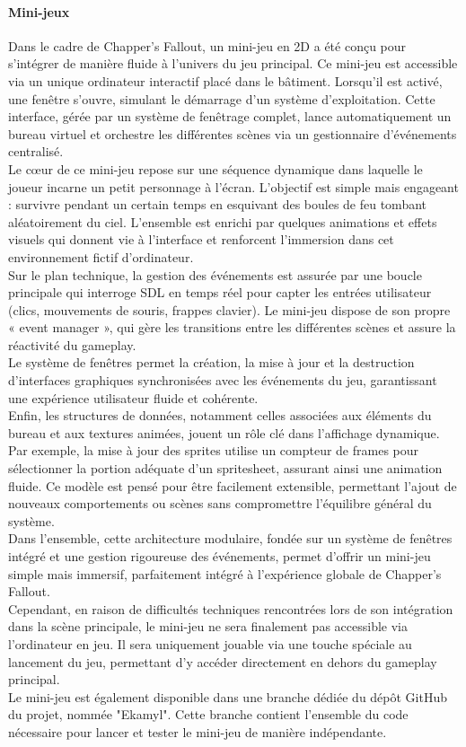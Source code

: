 \paragraph{Mini-jeux}
Dans le cadre de Chapper's Fallout, un mini-jeu en 2D a été conçu pour s’intégrer de manière fluide à l’univers 
du jeu principal. Ce mini-jeu est accessible via un unique ordinateur interactif placé dans le bâtiment. Lorsqu’il 
est activé, une fenêtre s’ouvre, simulant le démarrage d’un système d’exploitation. Cette interface, gérée par un 
système de fenêtrage complet, lance automatiquement un bureau virtuel et orchestre les différentes scènes via un 
gestionnaire d’événements centralisé.
\\
Le cœur de ce mini-jeu repose sur une séquence dynamique dans laquelle le joueur incarne un petit personnage à l’écran. 
L’objectif est simple mais engageant : survivre pendant un certain temps en esquivant des boules de feu tombant aléatoirement 
du ciel. L’ensemble est enrichi par quelques animations et effets visuels qui donnent vie à l’interface et renforcent 
l’immersion dans cet environnement fictif d’ordinateur.
\\
Sur le plan technique, la gestion des événements est assurée par une boucle principale qui interroge SDL en temps réel pour 
capter les entrées utilisateur (clics, mouvements de souris, frappes clavier). Le mini-jeu dispose de son propre « event manager », 
qui gère les transitions entre les différentes scènes et assure la réactivité du gameplay.
\\
Le système de fenêtres permet la création, la mise à jour et la destruction d’interfaces graphiques synchronisées avec les 
événements du jeu, garantissant une expérience utilisateur fluide et cohérente.
\\
Enfin, les structures de données, notamment celles associées aux éléments du bureau et aux textures animées, jouent un rôle clé dans 
l’affichage dynamique. Par exemple, la mise à jour des sprites utilise un compteur de frames pour sélectionner la portion adéquate 
d’un spritesheet, assurant ainsi une animation fluide. Ce modèle est pensé pour être facilement extensible, permettant l’ajout de 
nouveaux comportements ou scènes sans compromettre l’équilibre général du système.
\\
Dans l’ensemble, cette architecture modulaire, fondée sur un système de fenêtres intégré et une gestion rigoureuse des événements, 
permet d’offrir un mini-jeu simple mais immersif, parfaitement intégré à l’expérience globale de Chapper's Fallout.
\\
Cependant, en raison de difficultés techniques rencontrées lors de son intégration dans la scène principale, le mini-jeu ne sera 
finalement pas accessible via l’ordinateur en jeu. Il sera uniquement jouable via une touche spéciale au lancement du jeu, permettant 
d’y accéder directement en dehors du gameplay principal.
\\
Le mini-jeu est également disponible dans une branche dédiée du dépôt GitHub du projet, nommée "Ekamyl". Cette branche contient 
l’ensemble du code nécessaire pour lancer et tester le mini-jeu de manière indépendante.
